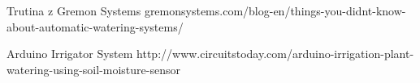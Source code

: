 \documentclass[12pt]{article}
\begin{document}
\newpage
\begin{thebibliography}{9}



 Trutina z Gremon Systems
gremonsystems.com/blog-en/things-you-didnt-know-about-automatic-watering-systems/

 Arduino Irrigator System
http://www.circuitstoday.com/arduino-irrigation-plant-watering-using-soil-moisture-sensor

%
%
%
%
%
% 
%
%
%
%




\end{thebibliography}
\end{document}
